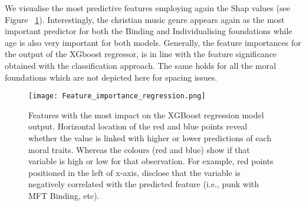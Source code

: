 \documentclass{article}
\begin{document}
We visualise the most predictive features employing again the Shap values (see Figure ~\ref{fig:feature_importance_regression}). Interestingly, the christian music genre appears again as the most important predictor for both the Binding and Individualising foundations while  age is also very important for both models. Generally, the feature importances for the output of the XGboost regressor, is in line with the feature significance obtained with the classification approach. The same holds for all the moral foundations which are not depicted here for spacing issues.




\begin{figure}[ht]
    \centering
    \texttt{[image: Feature\_importance\_regression.png]}
    \caption{Features with the most impact on the XGBoost regression model output. Horizontal location of the red and blue points reveal whether the value is linked with higher or lower predictions of each moral traits. Whereas the colours (red and blue) show if that variable is high or low for that observation. For example, red points positioned in the left of x-axis, disclose that the variable is negatively correlated with the predicted feature (i.e., punk with MFT Binding, etc).}
    \label{fig:feature_importance_regression}
\end{figure}
\end{document}

